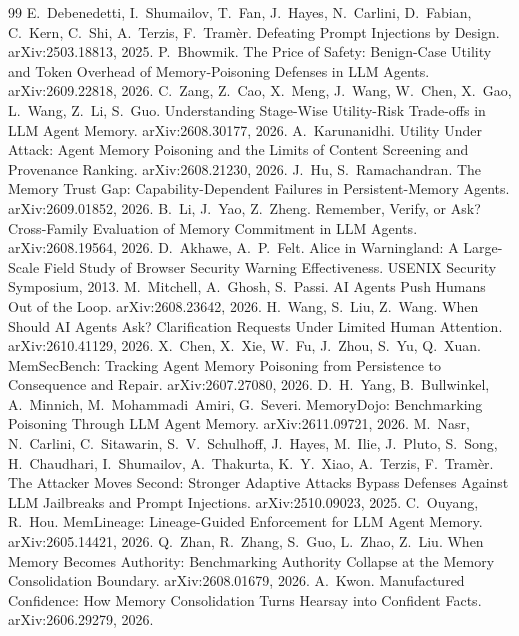 \documentclass[10pt]{article}
\begin{document}
\begin{thebibliography}{99}
 E.~Debenedetti, I.~Shumailov, T.~Fan, J.~Hayes, N.~Carlini, D.~Fabian, C.~Kern,
C.~Shi, A.~Terzis, F.~Tram\`er. Defeating Prompt Injections by Design. arXiv:2503.18813, 2025.
 P.~Bhowmik. The Price of Safety: Benign-Case Utility and Token Overhead of
Memory-Poisoning Defenses in LLM Agents. arXiv:2609.22818, 2026.
 C.~Zang, Z.~Cao, X.~Meng, J.~Wang, W.~Chen, X.~Gao, L.~Wang, Z.~Li, S.~Guo.
Understanding Stage-Wise Utility-Risk Trade-offs in LLM Agent Memory. arXiv:2608.30177, 2026.
 A.~Karunanidhi. Utility Under Attack: Agent Memory Poisoning and the
Limits of Content Screening and Provenance Ranking. arXiv:2608.21230, 2026.
 J.~Hu, S.~Ramachandran. The Memory Trust Gap: Capability-Dependent Failures in
Persistent-Memory Agents. arXiv:2609.01852, 2026.
 B.~Li, J.~Yao, Z.~Zheng. Remember, Verify, or Ask? Cross-Family
Evaluation of Memory Commitment in LLM Agents. arXiv:2608.19564, 2026.
 D.~Akhawe, A.~P.~Felt. Alice in Warningland: A Large-Scale Field Study of
Browser Security Warning Effectiveness. USENIX Security Symposium, 2013.
 M.~Mitchell, A.~Ghosh, S.~Passi. AI Agents Push Humans Out of the Loop.
arXiv:2608.23642, 2026.
 H.~Wang, S.~Liu, Z.~Wang. When Should AI Agents Ask? Clarification Requests
Under Limited Human Attention. arXiv:2610.41129, 2026.
 X.~Chen, X.~Xie, W.~Fu, J.~Zhou, S.~Yu, Q.~Xuan. MemSecBench: Tracking Agent
Memory Poisoning from Persistence to Consequence and Repair. arXiv:2607.27080, 2026.
 D.~H.~Yang, B.~Bullwinkel, A.~Minnich, M.~Mohammadi~Amiri, G.~Severi.
MemoryDojo: Benchmarking Poisoning Through LLM Agent Memory. arXiv:2611.09721, 2026.
 M.~Nasr, N.~Carlini, C.~Sitawarin, S.~V.~Schulhoff, J.~Hayes,
M.~Ilie, J.~Pluto, S.~Song, H.~Chaudhari, I.~Shumailov, A.~Thakurta, K.~Y.~Xiao, A.~Terzis,
F.~Tram\`er. The Attacker Moves Second: Stronger Adaptive Attacks Bypass Defenses Against LLM
Jailbreaks and Prompt Injections. arXiv:2510.09023, 2025.
 C.~Ouyang, R.~Hou. MemLineage: Lineage-Guided Enforcement for LLM Agent
Memory. arXiv:2605.14421, 2026.
 Q.~Zhan, R.~Zhang, S.~Guo, L.~Zhao, Z.~Liu. When Memory Becomes
Authority: Benchmarking Authority Collapse at the Memory Consolidation Boundary. arXiv:2608.01679,
2026.
 A.~Kwon. Manufactured Confidence: How Memory Consolidation Turns
Hearsay into Confident Facts. arXiv:2606.29279, 2026.

\end{thebibliography}
\end{document}
